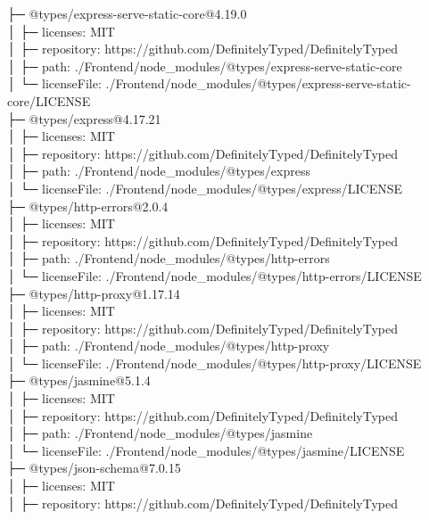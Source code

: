 \documentclass[
    paper=a4,
    twoside=false,
    parskip=half,
    listof=entryprefix,
    listof=totoc,
    index=totoc,
    bibliography=totoc,
    headsepline,
]{scrbook}
\begin{document}
    ├─ @types/express-serve-static-core@4.19.0\\
    │  ├─ licenses: MIT\\
    │  ├─ repository: https://github.com/DefinitelyTyped/DefinitelyTyped\\
    │  ├─ path: ./Frontend/node\_modules/@types/express-serve-static-core\\
    │  └─ licenseFile: ./Frontend/node\_modules/@types/express-serve-static-core/LICENSE\\
    ├─ @types/express@4.17.21\\
    │  ├─ licenses: MIT\\
    │  ├─ repository: https://github.com/DefinitelyTyped/DefinitelyTyped\\
    │  ├─ path: ./Frontend/node\_modules/@types/express\\
    │  └─ licenseFile: ./Frontend/node\_modules/@types/express/LICENSE\\
    ├─ @types/http-errors@2.0.4\\
    │  ├─ licenses: MIT\\
    │  ├─ repository: https://github.com/DefinitelyTyped/DefinitelyTyped\\
    │  ├─ path: ./Frontend/node\_modules/@types/http-errors\\
    │  └─ licenseFile: ./Frontend/node\_modules/@types/http-errors/LICENSE\\
    ├─ @types/http-proxy@1.17.14\\
    │  ├─ licenses: MIT\\
    │  ├─ repository: https://github.com/DefinitelyTyped/DefinitelyTyped\\
    │  ├─ path: ./Frontend/node\_modules/@types/http-proxy\\
    │  └─ licenseFile: ./Frontend/node\_modules/@types/http-proxy/LICENSE\\
    ├─ @types/jasmine@5.1.4\\
    │  ├─ licenses: MIT\\
    │  ├─ repository: https://github.com/DefinitelyTyped/DefinitelyTyped\\
    │  ├─ path: ./Frontend/node\_modules/@types/jasmine\\
    │  └─ licenseFile: ./Frontend/node\_modules/@types/jasmine/LICENSE\\
    ├─ @types/json-schema@7.0.15\\
    │  ├─ licenses: MIT\\
    │  ├─ repository: https://github.com/DefinitelyTyped/DefinitelyTyped\\
\end{document}

